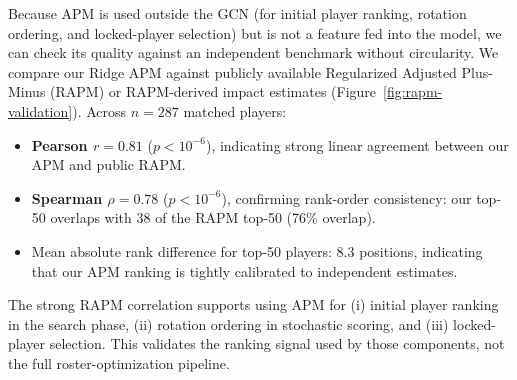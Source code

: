 \documentclass[11pt,letterpaper]{article}
\begin{document}
Because APM is used outside the GCN (for initial player ranking,
rotation ordering, and locked-player selection) but is not a feature
fed into the model, we can check its quality against an independent
benchmark without circularity. We compare our Ridge APM against
publicly available Regularized Adjusted Plus-Minus (RAPM) or
RAPM-derived impact estimates
\cite{sill2010rapm,ghimire2020rapm,dunksandthreesEpm}
(Figure~\ref{fig:rapm-validation}). Across $n = 287$ matched players:

\begin{itemize}[leftmargin=*]
  \item \textbf{Pearson $r = 0.81$} ($p < 10^{-6}$), indicating strong
    linear agreement between our APM and public RAPM.
  \item \textbf{Spearman $\rho = 0.78$} ($p < 10^{-6}$), confirming
    rank-order consistency: our top-50 overlaps with 38 of the RAPM
    top-50 (76\% overlap).
  \item Mean absolute rank difference for top-50 players: 8.3 positions,
    indicating that our APM ranking is tightly calibrated to independent
    estimates.
\end{itemize}

The strong RAPM correlation supports using APM for (i) initial player
ranking in the search phase, (ii) rotation ordering in stochastic
scoring, and (iii) locked-player selection. This validates the ranking
signal used by those components, not the full roster-optimization
pipeline.
\end{document}
